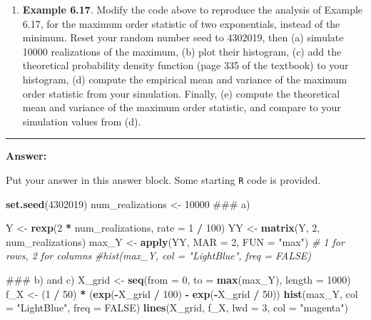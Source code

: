 \documentclass[]{article}
\newenvironment{Shaded}{\begin{snugshade}}{\end{snugshade}}
\newcommand{\KeywordTok}[1]{\textcolor[rgb]{0.13,0.29,0.53}{\textbf{#1}}}
\newcommand{\DataTypeTok}[1]{\textcolor[rgb]{0.13,0.29,0.53}{#1}}
\newcommand{\DecValTok}[1]{\textcolor[rgb]{0.00,0.00,0.81}{#1}}
\newcommand{\StringTok}[1]{\textcolor[rgb]{0.31,0.60,0.02}{#1}}
\newcommand{\CommentTok}[1]{\textcolor[rgb]{0.56,0.35,0.01}{\textit{#1}}}
\newcommand{\OtherTok}[1]{\textcolor[rgb]{0.56,0.35,0.01}{#1}}
\newcommand{\OperatorTok}[1]{\textcolor[rgb]{0.81,0.36,0.00}{\textbf{#1}}}
\newcommand{\NormalTok}[1]{#1}
\providecommand{\tightlist}{%
  \setlength{\itemsep}{0pt}\setlength{\parskip}{0pt}}
\begin{document}
\begin{enumerate}
\def\labelenumi{\arabic{enumi}.}
\tightlist
\item
  \textbf{Example 6.17}. Modify the code above to reproduce the analysis
  of Example 6.17, for the maximum order statistic of two exponentials,
  instead of the minimum. Reset your random number seed to 4302019, then
  (a) simulate 10000 realizations of the maximum, (b) plot their
  histogram, (c) add the theoretical probability density function (page
  335 of the textbook) to your histogram, (d) compute the empirical mean
  and variance of the maximum order statistic from your simulation.
  Finally, (e) compute the theoretical mean and variance of the maximum
  order statistic, and compare to your simulation values from (d).
\end{enumerate}

\begin{center}\rule{0.5\linewidth}{\linethickness}\end{center}

\textbf{Answer:}

Put your answer in this answer block. Some starting \texttt{R} code is
provided.

\begin{Shaded}
\begin{Highlighting}[]
\KeywordTok{set.seed}\NormalTok{(}\DecValTok{4302019}\NormalTok{)}
\NormalTok{num_realizations <-}\StringTok{ }\DecValTok{10000}
\NormalTok{### a)}


\NormalTok{Y <-}\StringTok{ }\KeywordTok{rexp}\NormalTok{(}\DecValTok{2} \OperatorTok{*}\StringTok{ }\NormalTok{num_realizations, }\DataTypeTok{rate =} \DecValTok{1} \OperatorTok{/}\StringTok{ }\DecValTok{100}\NormalTok{)}
\NormalTok{YY <-}\StringTok{ }\KeywordTok{matrix}\NormalTok{(Y, }\DecValTok{2}\NormalTok{, num_realizations)}
\NormalTok{max_Y <-}\StringTok{ }\KeywordTok{apply}\NormalTok{(YY, }\DataTypeTok{MAR =} \DecValTok{2}\NormalTok{, }\DataTypeTok{FUN =} \StringTok{"max"}\NormalTok{) }\CommentTok{# 1 for rows, 2 for columns}
\CommentTok{#hist(max_Y, col = "LightBlue", freq = FALSE)}

\NormalTok{### b) and c)}
\NormalTok{X_grid <-}\StringTok{ }\KeywordTok{seq}\NormalTok{(}\DataTypeTok{from =} \DecValTok{0}\NormalTok{, }\DataTypeTok{to =} \KeywordTok{max}\NormalTok{(max_Y), }\DataTypeTok{length =} \DecValTok{1000}\NormalTok{)}
\NormalTok{f_X <-}\StringTok{ }\NormalTok{(}\DecValTok{1} \OperatorTok{/}\StringTok{ }\DecValTok{50}\NormalTok{) }\OperatorTok{*}\StringTok{ }\NormalTok{(}\KeywordTok{exp}\NormalTok{(}\OperatorTok{-}\NormalTok{X_grid }\OperatorTok{/}\StringTok{ }\DecValTok{100}\NormalTok{) }\OperatorTok{-}\StringTok{ }\KeywordTok{exp}\NormalTok{(}\OperatorTok{-}\NormalTok{X_grid }\OperatorTok{/}\StringTok{ }\DecValTok{50}\NormalTok{))}
\KeywordTok{hist}\NormalTok{(max_Y, }\DataTypeTok{col =} \StringTok{"LightBlue"}\NormalTok{, }\DataTypeTok{freq =} \OtherTok{FALSE}\NormalTok{) }
\KeywordTok{lines}\NormalTok{(X_grid, f_X, }\DataTypeTok{lwd =} \DecValTok{3}\NormalTok{, }\DataTypeTok{col =} \StringTok{"magenta"}\NormalTok{)}
\end{Highlighting}
\end{Shaded}
\end{document}
